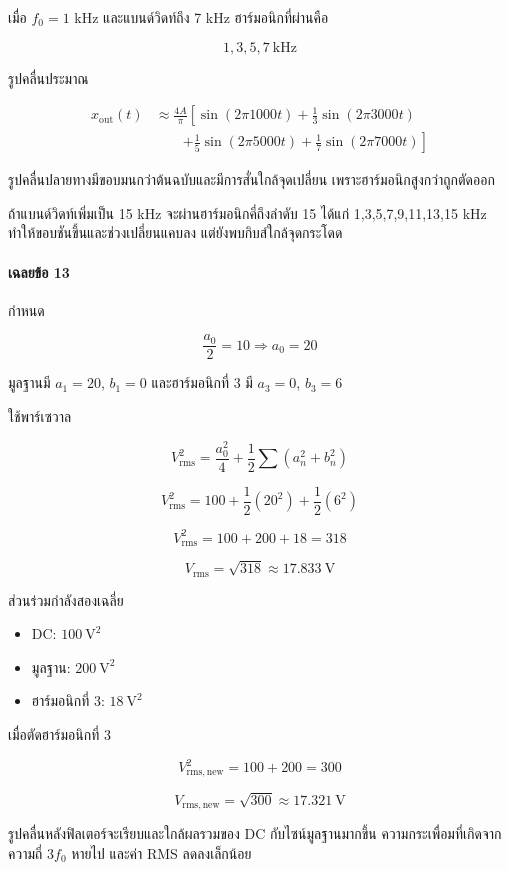 เมื่อ \(f_0=1\) kHz และแบนด์วิดท์ถึง 7 kHz ฮาร์มอนิกที่ผ่านคือ

\[
1,3,5,7\ \text{kHz}
\]

รูปคลื่นประมาณ

\[
\begin{aligned}
x_{\mathrm{out}}(t)
&\approx\frac{4A}{\pi}\left[
\sin(2\pi1000t)
+\frac{1}{3}\sin(2\pi3000t)\right.\\
&\qquad\left.
+\frac{1}{5}\sin(2\pi5000t)
+\frac{1}{7}\sin(2\pi7000t)
\right]
\end{aligned}
\]

รูปคลื่นปลายทางมีขอบมนกว่าต้นฉบับและมีการสั่นใกล้จุดเปลี่ยน เพราะฮาร์มอนิกสูงกว่าถูกตัดออก

ถ้าแบนด์วิดท์เพิ่มเป็น 15 kHz จะผ่านฮาร์มอนิกคี่ถึงลำดับ 15 ได้แก่ 1,3,5,7,9,11,13,15 kHz ทำให้ขอบชันขึ้นและช่วงเปลี่ยนแคบลง แต่ยังพบกิบส์ใกล้จุดกระโดด

\paragraph{เฉลยข้อ 13}

กำหนด

\[
\frac{a_0}{2}=10\Rightarrow a_0=20
\]

มูลฐานมี \(a_1=20\), \(b_1=0\) และฮาร์มอนิกที่ 3 มี \(a_3=0\), \(b_3=6\)

ใช้พาร์เซวาล

\[
V_{\mathrm{rms}}^2
=\frac{a_0^2}{4}+\frac{1}{2}\sum(a_n^2+b_n^2)
\]

\[
V_{\mathrm{rms}}^2
=100+\frac{1}{2}(20^2)+\frac{1}{2}(6^2)
\]

\[
V_{\mathrm{rms}}^2=100+200+18=318
\]

\[
V_{\mathrm{rms}}=\sqrt{318}\approx17.833\ \text{V}
\]

ส่วนร่วมกำลังสองเฉลี่ย

\begin{itemize}
\item
  DC: \(100\ \text{V}^2\)
\item
  มูลฐาน: \(200\ \text{V}^2\)
\item
  ฮาร์มอนิกที่ 3: \(18\ \text{V}^2\)
\end{itemize}

เมื่อตัดฮาร์มอนิกที่ 3

\[
V_{\mathrm{rms,new}}^2=100+200=300
\]

\[
V_{\mathrm{rms,new}}=\sqrt{300}\approx17.321\ \text{V}
\]

รูปคลื่นหลังฟิลเตอร์จะเรียบและใกล้ผลรวมของ DC กับไซน์มูลฐานมากขึ้น ความกระเพื่อมที่เกิดจากความถี่ \(3f_0\) หายไป และค่า RMS ลดลงเล็กน้อย

